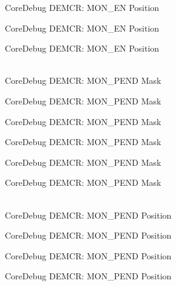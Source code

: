 \begin{DoxyRefList}
\label{deprecated__deprecated000415}%
%
Core\+Debug DEMCR:\+ MON\+\_\+\+EN Position 

\label{deprecated__deprecated000504}%
%
Core\+Debug DEMCR:\+ MON\+\_\+\+EN Position 

\label{deprecated__deprecated000606}%
%
Core\+Debug DEMCR:\+ MON\+\_\+\+EN Position  
\item[{\parbox[t]{\linewidth}{Global \doxylink{group__CMSIS__CoreDebug_ga68ec55930269fab78e733dcfa32392f8}{Core\+Debug\+\_\+\+DEMCR\+\_\+\+MON\+\_\+\+PEND\+\_\+\+Msk} }}]\hfill \\
\label{deprecated__deprecated000052}%
%
Core\+Debug DEMCR:\+ MON\+\_\+\+PEND Mask 

\label{deprecated__deprecated000196}%
%
Core\+Debug DEMCR:\+ MON\+\_\+\+PEND Mask 

\label{deprecated__deprecated000338}%
%
Core\+Debug DEMCR:\+ MON\+\_\+\+PEND Mask 

\label{deprecated__deprecated000414}%
%
Core\+Debug DEMCR:\+ MON\+\_\+\+PEND Mask 

\label{deprecated__deprecated000503}%
%
Core\+Debug DEMCR:\+ MON\+\_\+\+PEND Mask 

\label{deprecated__deprecated000605}%
%
Core\+Debug DEMCR:\+ MON\+\_\+\+PEND Mask  
\item[{\parbox[t]{\linewidth}{Global \doxylink{group__CMSIS__CoreDebug_ga1e2f706a59e0d8131279af1c7e152f8d}{Core\+Debug\+\_\+\+DEMCR\+\_\+\+MON\+\_\+\+PEND\+\_\+\+Pos} }}]\hfill \\
\label{deprecated__deprecated000051}%
%
Core\+Debug DEMCR:\+ MON\+\_\+\+PEND Position 

\label{deprecated__deprecated000195}%
%
Core\+Debug DEMCR:\+ MON\+\_\+\+PEND Position 

\label{deprecated__deprecated000337}%
%
Core\+Debug DEMCR:\+ MON\+\_\+\+PEND Position 

\label{deprecated__deprecated000413}%
%
Core\+Debug DEMCR:\+ MON\+\_\+\+PEND Position 


\end{DoxyRefList}
